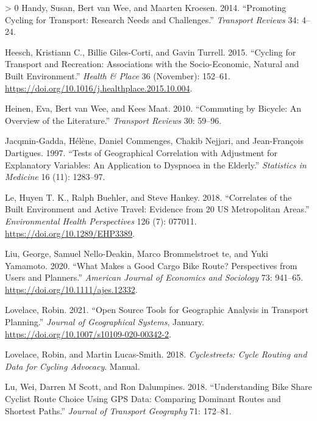 \documentclass[smallextended]{svjour3}       %
\newlength{\cslhangindent}
\newenvironment{CSLReferences}[3] %
 {%
  \setlength{\parindent}{0pt}
  \ifodd #1 \everypar{\setlength{\hangindent}{\cslhangindent}}\ignorespaces\fi
  \ifnum #2 > 0
  \setlength{\parskip}{#2\baselineskip}
  \fi
 }%
 {}
\begin{document}
\begin{CSLReferences}{1}{0}
\leavevmode\hypertarget{ref-handyPromotingCyclingTransport2014}{}%
Handy, Susan, Bert van Wee, and Maarten Kroesen. 2014. {``Promoting
Cycling for Transport: {Research} Needs and Challenges.''}
\emph{Transport Reviews} 34: 4--24.

\leavevmode\hypertarget{ref-Heesch2015}{}%
Heesch, Kristiann C., Billie Giles-Corti, and Gavin Turrell. 2015.
{``Cycling for Transport and Recreation: {Associations} with the
Socio-Economic, Natural and Built Environment.''} \emph{Health \& Place}
36 (November): 152--61.
\url{https://doi.org/10.1016/j.healthplace.2015.10.004}.

\leavevmode\hypertarget{ref-heinenCommutingBicycleOverview2010}{}%
Heinen, Eva, Bert van Wee, and Kees Maat. 2010. {``Commuting by Bicycle:
{An} Overview of the Literature.''} \emph{Transport Reviews} 30: 59--96.

\leavevmode\hypertarget{ref-Jacqmin1997}{}%
Jacqmin-Gadda, Hélène, Daniel Commenges, Chakib Nejjari, and
Jean-François Dartigues. 1997. {``Tests of Geographical Correlation with
Adjustment for Explanatory Variables: An Application to Dyspnoea in the
Elderly.''} \emph{Statistics in Medicine} 16 (11): 1283--97.

\leavevmode\hypertarget{ref-Le2018}{}%
Le, Huyen T. K., Ralph Buehler, and Steve Hankey. 2018. {``Correlates of
the Built Environment and Active Travel: {Evidence} from 20 {US}
Metropolitan Areas.''} \emph{Environmental Health Perspectives} 126 (7):
077011. \url{https://doi.org/10.1289/EHP3389}.

\leavevmode\hypertarget{ref-liuWhatMakesGood2020}{}%
Liu, George, Samuel Nello-Deakin, Marco Brommelstroet te, and Yuki
Yamamoto. 2020. {``What Makes a Good Cargo Bike Route? {Perspectives}
from Users and Planners.''} \emph{American Journal of Economics and
Sociology} 73: 941--65. \url{https://doi.org/10.1111/ajes.12332}.

\leavevmode\hypertarget{ref-lovelaceOpenSourceTools2021}{}%
Lovelace, Robin. 2021. {``Open Source Tools for Geographic Analysis in
Transport Planning.''} \emph{Journal of Geographical Systems}, January.
\url{https://doi.org/10.1007/s10109-020-00342-2}.

\leavevmode\hypertarget{ref-Lovelace2018}{}%
Lovelace, Robin, and Martin Lucas-Smith. 2018. \emph{Cyclestreets:
{Cycle} Routing and Data for Cycling Advocacy}. Manual.

\leavevmode\hypertarget{ref-Lu2018understanding}{}%
Lu, Wei, Darren M Scott, and Ron Dalumpines. 2018. {``Understanding Bike
Share Cyclist Route Choice Using {GPS} Data: {Comparing} Dominant Routes
and Shortest Paths.''} \emph{Journal of Transport Geography} 71:
172--81.


\end{CSLReferences}
\end{document}
